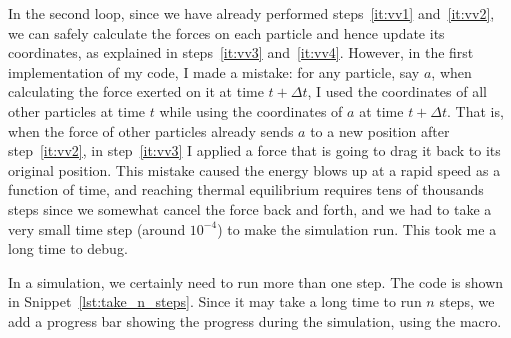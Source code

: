 In the second  loop, since we have already performed steps~\ref{it:vv1}
and~\ref{it:vv2}, we can safely calculate the forces on each particle and hence update its
coordinates, as explained in steps~\ref{it:vv3} and~\ref{it:vv4}.
However, in the first implementation of my code, I made a mistake: for any particle, say \(a\),
when calculating the force exerted on it at time \(t + \Delta t\), I used the coordinates of
all other particles at time \(t\) while using the coordinates of \(a\) at time \(t + \Delta t\).
That is, when the force of other particles already sends \(a\) to a new position after
step~\ref{it:vv2}, in step~\ref{it:vv3} I applied a force that is going to drag it
back to its original position. This mistake caused the energy blows up at a rapid
speed as a function of time, and reaching thermal equilibrium requires tens of thousands
steps since we somewhat cancel the force back and forth, and we had to take a very small
time step (around \(10^{-4}\)) to make the simulation run. This took me a long time to debug.

In a simulation, we certainly need to run more than one step. The code is shown in
Snippet~\ref{lst:take_n_steps}.
Since it may take a long time to run \(n\) steps, we add a progress bar showing the
progress during the simulation, using the  macro.
